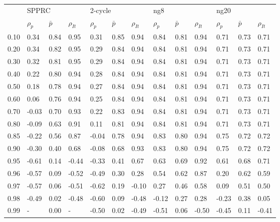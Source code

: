 \begin{tabular}{lllllllllllll}
\toprule
{} & \multicolumn{3}{l}{SPPRC} & \multicolumn{3}{l}{2-cycle} & \multicolumn{3}{l}{ng8} & \multicolumn{3}{l}{ng20} \\
{} & $\rho_p$ & $\bar p$ & $\rho_{It}$ & $\rho_p$ & $\bar p$ & $\rho_{It}$ & $\rho_p$ & $\bar p$ & $\rho_{It}$ & $\rho_p$ & $\bar p$ & $\rho_{It}$ \\
\midrule
0.10 &     0.34 &     0.84 &     0.95 &     0.31 &     0.85 &     0.94 &     0.84 &     0.81 &     0.94 &     0.71 &     0.73 &     0.71 \\
0.20 &     0.34 &     0.82 &     0.95 &     0.29 &     0.84 &     0.94 &     0.84 &     0.81 &     0.94 &     0.71 &     0.73 &     0.71 \\
0.30 &     0.32 &     0.81 &     0.95 &     0.29 &     0.84 &     0.94 &     0.84 &     0.81 &     0.94 &     0.71 &     0.73 &     0.71 \\
0.40 &     0.22 &     0.80 &     0.94 &     0.28 &     0.84 &     0.94 &     0.84 &     0.81 &     0.94 &     0.71 &     0.73 &     0.71 \\
0.50 &     0.18 &     0.78 &     0.94 &     0.27 &     0.84 &     0.94 &     0.84 &     0.81 &     0.94 &     0.71 &     0.73 &     0.71 \\
0.60 &     0.06 &     0.76 &     0.94 &     0.25 &     0.84 &     0.94 &     0.84 &     0.81 &     0.94 &     0.71 &     0.73 &     0.71 \\
0.70 &    -0.03 &     0.70 &     0.93 &     0.22 &     0.83 &     0.94 &     0.84 &     0.81 &     0.94 &     0.71 &     0.73 &     0.71 \\
0.80 &    -0.09 &     0.63 &     0.91 &     0.11 &     0.81 &     0.94 &     0.84 &     0.81 &     0.94 &     0.71 &     0.73 &     0.71 \\
0.85 &    -0.22 &     0.56 &     0.87 &    -0.04 &     0.78 &     0.94 &     0.83 &     0.80 &     0.94 &     0.75 &     0.72 &     0.72 \\
0.90 &    -0.30 &     0.40 &     0.68 &    -0.08 &     0.68 &     0.93 &     0.83 &     0.80 &     0.94 &     0.75 &     0.72 &     0.72 \\
0.95 &    -0.61 &     0.14 &    -0.44 &    -0.33 &     0.41 &     0.67 &     0.63 &     0.69 &     0.92 &     0.61 &     0.68 &     0.71 \\
0.96 &    -0.57 &     0.09 &    -0.52 &    -0.49 &     0.30 &     0.28 &     0.54 &     0.62 &     0.87 &     0.20 &     0.62 &     0.59 \\
0.97 &    -0.57 &     0.06 &    -0.51 &    -0.62 &     0.19 &    -0.10 &     0.27 &     0.46 &     0.58 &     0.09 &     0.51 &     0.50 \\
0.98 &    -0.49 &     0.02 &    -0.48 &    -0.60 &     0.09 &    -0.48 &    -0.12 &     0.27 &     0.28 &    -0.23 &     0.38 &     0.05 \\
0.99 &        - &     0.00 &        - &    -0.50 &     0.02 &    -0.49 &    -0.51 &     0.06 &    -0.50 &    -0.45 &     0.11 &    -0.41 \\
\bottomrule
\end{tabular}
